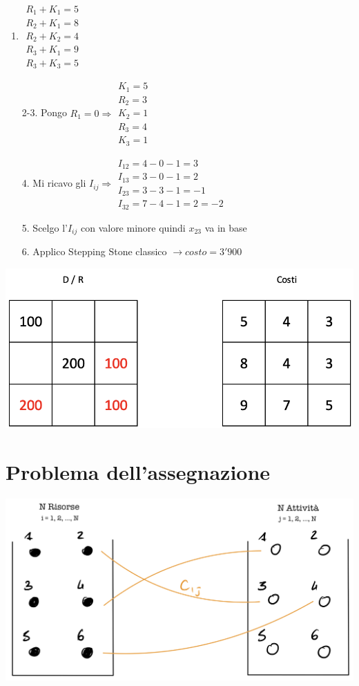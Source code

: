 \documentclass[12pt,a4paper]{article}
\begin{document}
\begin{enumerate}
\item $\begin{array}{l}R_1+K_1=5\\R_2+K_1=8\\R_2+K_2=4\\R_3+K_1=9\\R_3+K_3=5\end{array}$
\item[2-3.]Pongo $R_1=0 \Rightarrow \begin{array}{l}K_1=5\\R_2=3\\K_2=1\\R_3=4\\K_3=1 \end{array}$
\item[4.]Mi ricavo gli $I_{ij} \Rightarrow \begin{array}{l}I_{12}=4-0-1 = 3\\I_{13}=3-0-1 = 2\\I_{23}=3-3-1 = -1\\I_{32}=7-4-1=2 = -2\end{array}$
\item[5.] Scelgo l'$I_{ij}$ con valore minore quindi $x_{23}$ va in base
\item[6.] Applico Stepping Stone classico $\rightarrow costo = 3'900$
\end{enumerate}
\begin{center}
\includegraphics[width=0.4\columnwidth]{img/pb_trasporto_modi2.png}
\end{center}

\clearpage
\section{Problema dell'assegnazione}
\begin{center}
\includegraphics[width=0.4\columnwidth]{img/assegnazione.jpg}
\end{center}
\end{document}
